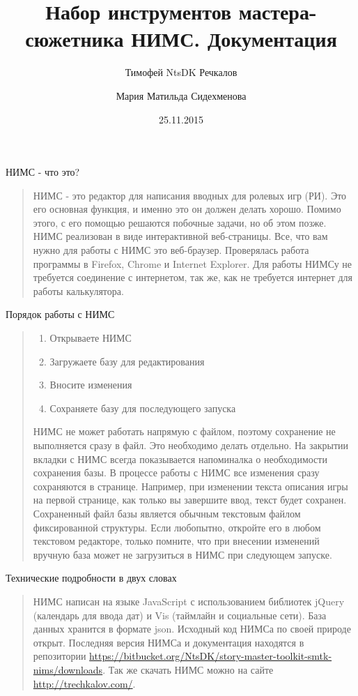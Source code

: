 \documentclass[a4paper,oneside,10pt,russian]{sphinxmanual}
\title{Набор инструментов мастера-сюжетника НИМС. Документация}
\date{25.11.2015}
\author{Тимофей NtsDK Речкалов\and Мария Матильда Сидехменова}
\begin{document}
\maketitle
\tableofcontents
{}\label{nims::doc}


НИМС - что это?
\begin{quote}

НИМС - это редактор для написания вводных для ролевых игр (РИ). Это его основная функция, и именно это он должен делать хорошо. Помимо этого, с его помощью решаются побочные задачи, но об этом позже.
НИМС реализован в виде интерактивной веб-страницы. Все, что вам нужно для работы с НИМС это веб-браузер. Проверялась работа программы в Firefox, Chrome и Internet Explorer. Для работы НИМСу не требуется соединение с интернетом, так же, как не требуется интернет для работы калькулятора.
\end{quote}

Порядок работы с НИМС
\begin{quote}
\begin{enumerate}
\item {}
Открываете НИМС

\item {}
Загружаете базу для редактирования

\item {}
Вносите изменения

\item {}
Сохраняете базу для последующего запуска

\end{enumerate}

НИМС не может работать напрямую с файлом, поэтому сохранение не выполняется сразу в файл. Это необходимо делать отдельно. На закрытии вкладки с НИМС всегда показывается напоминалка о необходимости сохранения базы.
В процессе работы с НИМС все изменения сразу сохраняются в странице. Например, при изменении текста описания игры на первой странице, как только вы завершите ввод, текст будет сохранен.
Сохраненный файл базы является обычным текстовым файлом фиксированной структуры. Если любопытно, откройте его в любом текстовом редакторе, только помните, что при внесении изменений вручную база может не загрузиться в НИМС при следующем запуске.
\end{quote}

Технические подробности в двух словах
\begin{quote}

НИМС написан на языке JavaScript с использованием библиотек jQuery (календарь для ввода дат) и Vis (таймлайн и социальные сети). База данных хранится в формате json.
Исходный код НИМСа по своей природе открыт. Последняя версия НИМСа и документация находятся в репозитории \href{https://bitbucket.org/NtsDK/story-master-toolkit-smtk-nims/downloads}{https://bitbucket.org/NtsDK/story-master-toolkit-smtk-nims/downloads}. Так же скачать НИМС можно на сайте \href{http://trechkalov.com/}{http://trechkalov.com/}.
\end{quote}
\end{document}
